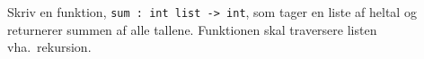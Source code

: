 Skriv en funktion, \lstinline{sum : int list -> int}, som tager en liste af heltal og returnerer summen af alle tallene. Funktionen skal traversere listen vha.\ rekursion. 
